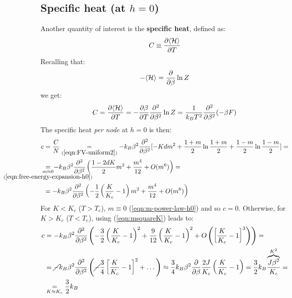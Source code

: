 \documentclass[../../main.tex]{subfiles}
\begin{document}
\subsection{Specific heat (at $h=0$)}
Another quantity of interest is the \textbf{specific heat}, defined as:
\begin{align*}
    C \equiv \pdv{\langle \mathcal{H} \rangle}{T}
\end{align*} 
Recalling that:
\begin{align*}
    -\langle \mathcal{H} \rangle = \pdv{\beta} \ln Z
\end{align*}
we get:
\begin{align*}
    C = \pdv{\langle \mathcal{H} \rangle}{T} = -\pdv{\beta}{T} \pdv[2]{\beta} \ln Z = \frac{1}{k_B T^2} \pdv[2]{\beta} (-\beta F) 
\end{align*}
The specific heat \textit{per node} at $h=0$ is then:
\begin{align*}
    c &= \frac{C}{N} \underset{(\ref{eqn:FV-uniform2})}{=} -k_B \beta^2 \pdv[2]{\beta} [-K d m^2 + \frac{1+m}{2}\ln\frac{1+m}{2} + \frac{1-m}{2}\ln\frac{1-m}{2}] =\\
    &\underset{\mathclap{\substack{m\approx0\\(\ref{eqn:free-energy-expansion-h0})}}}{=} \> -k_B \beta^2 \pdv[2]{\beta} \left(\frac{1-2dK}{2} m^2 + \frac{m^4}{12} + O(m^6)\right) =\\
    &= -k_B \beta^2 \pdv[2]{\beta} \left(-\frac{1}{2}\left(\frac{K}{K_c} -1 \right)m^2 + \frac{m^4}{12} + O(m^6) \right)
\end{align*}
For $K < K_c$ ($T > T_c$), $m\equiv 0$ (\ref{eqn:m-power-law-h0}) and so $c=0$. Otherwise, for $K > K_c$ ($T < T_c$), using (\ref{eqn:msquareK}) leads to:
\begin{align*}
    c &= -k_B \beta^2 \pdv[2]{\beta} \left(-\frac{3}{2}\left(\frac{K}{K_c}-1 \right)^2 + \frac{9}{12}\left(\frac{K}{K_c} -1\right)^2 + O\left(\left[\frac{K}{K_c}-1 \right]^3\right) \right) =\\
    &= \cancel{-}k_B \beta^2 \pdv[2]{\beta} \left(\cancel{-}\frac{3}{4} \left[\frac{K}{K_c} - 1 \right]^2 + \dots \right) \approx \frac{3}{4}  k_B \beta^2 \pdv{\beta} \frac{2J}{K_c}  \left(\frac{K}{K_c}-1 \right) = \frac{3}{2} k_B \frac{\overbrace{J \beta^2}^{K^2}}{K_c} =\\
    &\underset{K \approx K_c}{=} \frac{3}{2}k_B 
\end{align*}
\end{document}
